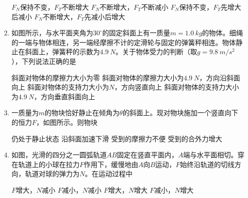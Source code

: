 \begin{enumerate}
\fourchoices
{$ F_{N} $保持不变，$ F_T $不断增大}
{$ F_{N} $不断增大，$ F_T $不断减小}
{$ F_{N} $保持不变，$ F_T $先增大后减小}
{$ F_{N} $不断增大，$ F_T $先减小后增大}



\item 
{}
如图所示，与水平面夹角为$ 30 ^{ \circ } $的固定斜面上有一质量$ m=1.0 \ kg $的物体。细绳的一端与物体相连，另一端经摩擦不计的定滑轮与固定的弹簧秤相连。物体静止在斜面上，弹簧秤的示数为$ 4.9 \ N $。关于物体受力的判断（取$ g=9.8 \ m/s ^{2} $），下列说法正确的是  
\begin{figure}[h!]
\centering

\end{figure}


\fourchoices
{斜面对物体的摩擦力大小为零}
{斜面对物体的摩擦力大小为$ 4.9 \ N $，方向沿斜面向上}
{斜面对物体的支持力大小为$ N $，方向竖直向上}
{斜面对物体的支持力大小为$ 4.9 \ N $，方向垂直斜面向上}



\item 
{}
一质量为$ m $的物块恰好静止在倾角为$ \theta $的斜面上。现对物块施加一个竖直向下的恒力$ F $，如图所示。则物块  
\begin{figure}[h!]
\centering

\end{figure}


\fourchoices
{仍处于静止状态}
{沿斜面加速下滑}
{受到的摩擦力不便}
{受到的合外力增大}


\item 
{}
如图，光滑的四分之一圆弧轨道$ AB $固定在竖直平面内，$ A $端与水平面相切。穿在轨道上的小球在拉力$ F $作用下，缓慢地由$ A $向$ B $运动，$ F $始终沿轨道的切线方向，轨道对球的弹力为$ N $。在运动过程中  

\begin{minipage}[h!]{0.7\linewidth}
\vspace{0.3em}
\fourchoices
{$ F $增大，$ N $减小 }
{$ F $减小，$ N $减小}
{$ F $增大，$ N $增大 }
{$ F $减小，$ N $增大}


\vspace{0.3em}
\end{minipage}
\hfill
\begin{minipage}[h!]{0.3\linewidth}
\flushright
\vspace{0.3em}

\vspace{0.3em}
\end{minipage}	


\end{enumerate}
